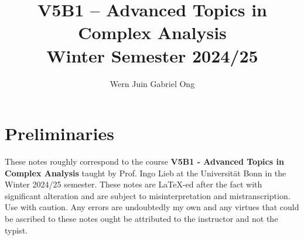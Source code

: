 \documentclass{amsart}
\theoremstyle{definition}
\numberwithin{equation}{section}
\begin{document}
\large
\title[Advanced Topics in Complex Analysis -- Bonn, Winter 2024/25]{V5B1 -- Advanced Topics in Complex Analysis \\ Winter Semester 2024/25}
\author{Wern Juin Gabriel Ong}
\address{Universit\"{a}t Bonn, Bonn, D-53113}
\maketitle
\section*{Preliminaries}
These notes roughly correspond to the course \textbf{V5B1 - Advanced Topics in Complex Analysis} taught by Prof. Ingo Lieb at the Universit\"{a}t Bonn in the Winter 2024/25 semester. These notes are \LaTeX-ed after the fact with significant alteration and are subject to misinterpretation and mistranscription. Use with caution. Any errors are undoubtedly my own and any virtues that could be ascribed to these notes ought be attributed to the instructor and not the typist. 
\newpage
\tableofcontents
















\appendix

\newpage
\printbibliography
\end{document}
